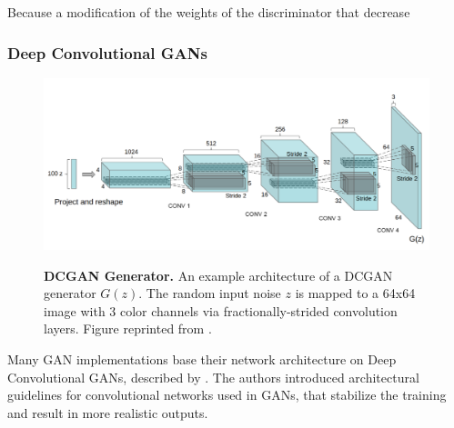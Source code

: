 \documentclass{article}
\begin{document}
Because a modification of the weights of the discriminator that decrease 

\subsubsection{Deep Convolutional GANs}

\begin{figure}[h]
\centering
{\includegraphics[width=\linewidth]{GAN/dcgan_generator}}
\caption{\label{fig:dcgan} \textbf{DCGAN Generator.} An example architecture of a DCGAN generator $G(z)$. The random input noise $z$ is mapped to a 64x64 image with 3 color channels via fractionally-strided convolution layers. Figure reprinted from \cite{radford_unsupervised_2015}.}
\end{figure}

Many GAN implementations base their network architecture on Deep Convolutional GANs, described by \cite{radford_unsupervised_2015}. The authors introduced architectural guidelines for convolutional networks used in GANs, that stabilize the training and result in more realistic outputs.
\end{document}
